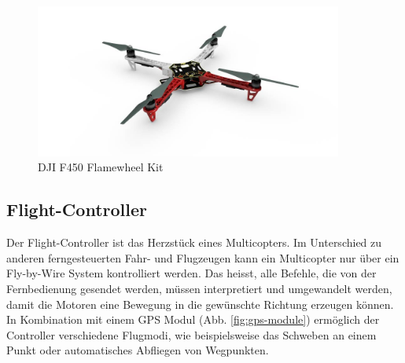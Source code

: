 \begin{figure}[h]
	\centering
	\includegraphics[width=0.9\textwidth] {images/hardware/f450.jpg}
	\caption{DJI F450 Flamewheel Kit}
	\label{fig:f450}
\end{figure}


\subsection{Flight-Controller}

Der Flight-Controller ist das Herzstück eines Multicopters. Im Unterschied zu anderen ferngesteuerten Fahr- und Flugzeugen kann ein Multicopter nur über ein Fly-by-Wire System kontrolliert werden. Das heisst, alle Befehle, die von der Fernbedienung gesendet werden, müssen interpretiert und umgewandelt werden, damit die Motoren eine Bewegung in die gewünschte Richtung erzeugen können. In Kombination mit einem GPS Modul (Abb. \ref{fig:gps-module}) ermöglich der Controller verschiedene Flugmodi, wie beispielsweise das Schweben an einem Punkt oder automatisches Abfliegen von Wegpunkten.

